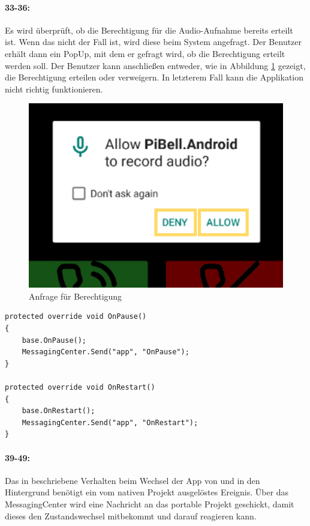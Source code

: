 \paragraph{33-36:} Es wird überprüft, ob die Berechtigung für die Audio-Aufnahme bereits erteilt ist.
Wenn das nicht der Fall ist, wird diese beim System angefragt.
Der Benutzer erhält dann ein PopUp, mit dem er gefragt wird, ob die Berechtigung erteilt werden soll.
Der Benutzer kann anschließen entweder, wie in Abbildung \ref{fig:permission} gezeigt, die Berechtigung erteilen oder verweigern.
In letzterem Fall kann die Applikation nicht richtig funktionieren.
\begin{figure}
    \centering
    \includegraphics[width=.5\linewidth]{images/xamarin/permissionRequest.png}
    \caption{Anfrage für Berechtigung}
    \label{fig:permission}
\end{figure}

\begin{verbatim}
protected override void OnPause()
{
    base.OnPause();
    MessagingCenter.Send("app", "OnPause");
}

protected override void OnRestart()
{
    base.OnRestart();
    MessagingCenter.Send("app", "OnRestart");
}
\end{verbatim}
\paragraph{39-49:} Das in  beschriebene Verhalten beim Wechsel der App von und in den Hintergrund benötigt ein vom nativen Projekt ausgelöstes Ereignis.
Über das MessagingCenter wird eine Nachricht an das portable Projekt geschickt, damit dieses den Zustandswechsel mitbekommt und darauf reagieren kann.
